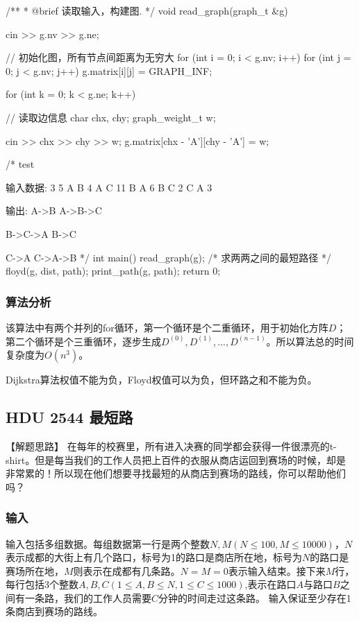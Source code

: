 \begin{Codex}[label=am_graph_floyd.cpp]
/**
 * @brief 读取输入，构建图.
 */
void read_graph(graph_t &g) {
    cin >> g.nv >> g.ne;

    // 初始化图，所有节点间距离为无穷大
    for (int i = 0; i < g.nv; i++) {
        for (int j = 0; j < g.nv; j++) {
            g.matrix[i][j] = GRAPH_INF;
        }
    }

    for (int k = 0; k < g.ne; k++) { // 读取边信息
        char chx, chy;
        graph_weight_t w;

        cin >> chx >> chy >> w;
        g.matrix[chx - 'A'][chy - 'A'] = w;
    }
}

/* test

输入数据:
3 5
A B 4
A C 11
B A 6
B C 2
C A 3

输出:
A->B
A->B->C

B->C->A
B->C

C->A
C->A->B
*/
int main() {
    read_graph(g);
    /* 求两两之间的最短路径 */
    floyd(g, dist, path);
    print_path(g, path);
    return 0;
}
\end{Codex}

\subsubsection{算法分析}
该算法中有两个并列的for循环，第一个循环是个二重循环，用于初始化方阵$D$；第二个循环是个三重循环，逐步生成$D^{(0)}, D^{(1)} ,...,D^{(n-1)}$。所以算法总的时间复杂度为$O(n^3)$。

Dijkstra算法权值不能为负，Floyd权值可以为负，但环路之和不能为负。


\subsection{HDU 2544 最短路}
【解题思路】
在每年的校赛里，所有进入决赛的同学都会获得一件很漂亮的t-shirt。但是每当我们的工作人员把上百件的衣服从商店运回到赛场的时候，却是非常累的！所以现在他们想要寻找最短的从商店到赛场的路线，你可以帮助他们吗？

\subsubsection{输入}
输入包括多组数据。每组数据第一行是两个整数$N,M(N \leq 100,M \leq 10000)$，$N$表示成都的大街上有几个路口，标号为1的路口是商店所在地，标号为$N$的路口是赛场所在地，$M$则表示在成都有几条路。$N=M=0$表示输入结束。接下来$M$行，每行包括3个整数$A,B,C(1 \leq A,B \leq N,1 \leq C \leq 1000)$,表示在路口$A$与路口$B$之间有一条路，我们的工作人员需要$C$分钟的时间走过这条路。
输入保证至少存在1条商店到赛场的路线。

